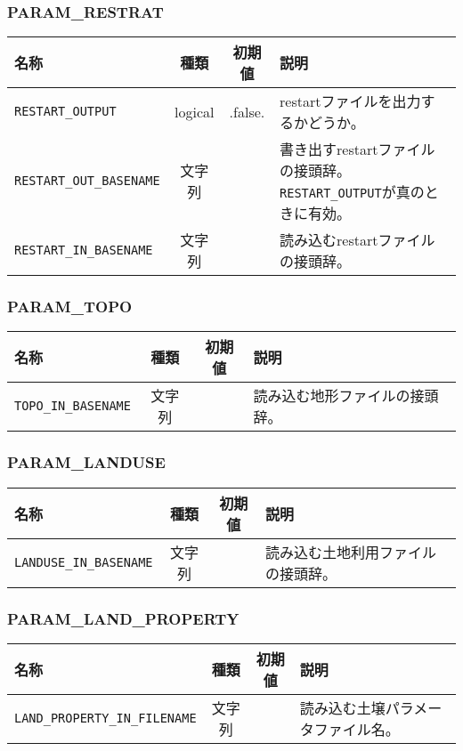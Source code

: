\subsubsection{PARAM\_RESTRAT}
\begin{tabularx}{150mm}{|l|c|c|X|} \hline
 \rowcolor[gray]{0.9} 名称 & 種類 & 初期値 & 説明 \\ \hline
 \verb|RESTART_OUTPUT| & logical & .false. & restartファイルを出力するかどうか。 \\ \hline
 \verb|RESTART_OUT_BASENAME| & 文字列 &  & 書き出すrestartファイルの接頭辞。\verb|RESTART_OUTPUT|が真のときに有効。 \\ \hline
 \verb|RESTART_IN_BASENAME| & 文字列 &  & 読み込むrestartファイルの接頭辞。 \\ \hline
\end{tabularx}


\subsubsection{PARAM\_TOPO}
\begin{tabularx}{150mm}{|l|c|c|X|} \hline
 \rowcolor[gray]{0.9} 名称 & 種類 & 初期値 & 説明 \\ \hline
 \verb|TOPO_IN_BASENAME| & 文字列 &  & 読み込む地形ファイルの接頭辞。 \\ \hline
\end{tabularx}


\subsubsection{PARAM\_LANDUSE}
\begin{tabularx}{150mm}{|l|c|c|X|} \hline
 \rowcolor[gray]{0.9} 名称 & 種類 & 初期値 & 説明 \\ \hline
 \verb|LANDUSE_IN_BASENAME| & 文字列 &  & 読み込む土地利用ファイルの接頭辞。 \\ \hline
\end{tabularx}


\subsubsection{PARAM\_LAND\_PROPERTY}
\begin{tabularx}{150mm}{|l|c|c|X|} \hline
 \rowcolor[gray]{0.9} 名称 & 種類 & 初期値 & 説明 \\ \hline
 \verb|LAND_PROPERTY_IN_FILENAME| & 文字列 &  & 読み込む土壌パラメータファイル名。 \\ \hline
\end{tabularx}


